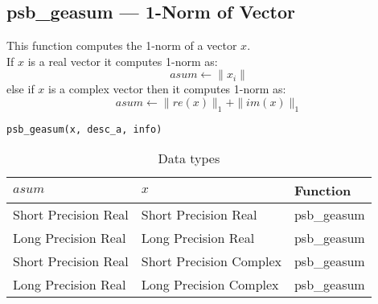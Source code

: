 %
%


\clearpage\subsection*{psb\_geasum --- 1-Norm of Vector}    

This function computes the 1-norm of a vector $x$.\\
If $x$ is a real vector
it computes 1-norm as:
\[ asum \leftarrow  \|x_i\|\]
else if $x$ is a complex vector then it computes 1-norm  as:
\[ asum \leftarrow \|re(x)\|_1 + \|im(x)\|_1\]


\begin{verbatim}
psb_geasum(x, desc_a, info)
\end{verbatim}

\begin{table}[h]
\begin{center}
\begin{tabular}{lll}
\hline
$asum$ & $x$ & {\bf Function}\\
\hline
Short Precision Real&Short Precision Real & psb\_geasum \\
Long Precision Real&Long Precision Real & psb\_geasum \\
Short Precision Real&Short Precision Complex & psb\_geasum \\
Long Precision Real&Long Precision Complex & psb\_geasum \\
\hline
\end{tabular}
\end{center}
\caption{Data types\label{tab:f90asum}}
\end{table}


